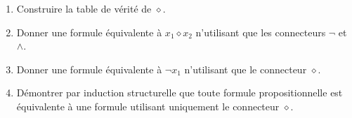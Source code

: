 \documentclass[a4paper,french,bookmarks]{book}
\begin{document}
    \begin{enumerate}
        \item Construire la table de vérité de $\diamond$.


        \item Donner une formule équivalente à $x_1 \diamond x_2$ n'utilisant que les connecteurs $\neg$ et $\land$.

        \noafter
        \nobefore\yesafter
        \yesbefore

        \item Donner une formule équivalente à $\neg x_1$ n'utilisant que le connecteur $\diamond$.
        
        
        \item Démontrer par induction structurelle que toute formule propositionnelle est équivalente à une formule utilisant uniquement le connecteur $\diamond$.
        

\end{enumerate}
\end{document}
